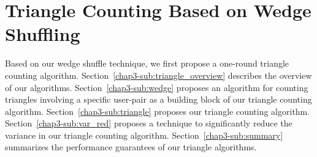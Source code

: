 \section{Triangle Counting Based on Wedge Shuffling}
\label{chap3-sec:triangle}
Based on our wedge shuffle technique, we first propose a
one-round triangle counting algorithm.
%
Section~\ref{chap3-sub:triangle_overview} describes the overview of our algorithms.
Section~\ref{chap3-sub:wedge} proposes an algorithm for counting triangles involving a specific user-pair
as a building block of our triangle counting algorithm.
Section~\ref{chap3-sub:triangle} proposes
our triangle counting algorithm.
Section~\ref{chap3-sub:var_red} proposes a technique to significantly reduce the variance in our triangle counting algorithm. 
Section~\ref{chap3-sub:summary} summarizes the performance guarantees of our triangle algorithms. 


